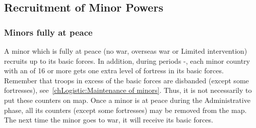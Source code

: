 



\subsection{Recruitment of Minor Powers}

\subsubsection{Minors fully at peace}
\aparag A minor which is fully at peace (no war, overseas war or Limited
intervention) recruits up to its basic forces.
\bparag In addition, during periods -, each minor
country with an  of 16 or more gets one extra level of fortress
in its basic forces.
\bparag Remember that troops in excess of the basic forces are disbanded
(except some fortresses), see~\ref{chLogistic:Maintenance of minors}.
\bparag Thus, it is not necessarily to put these counters on map. Once a minor
is at peace during the Administrative phase, all its counters (except some
fortresses) may be removed from the map. The next time the minor goes to war,
it will receive its basic forces.

